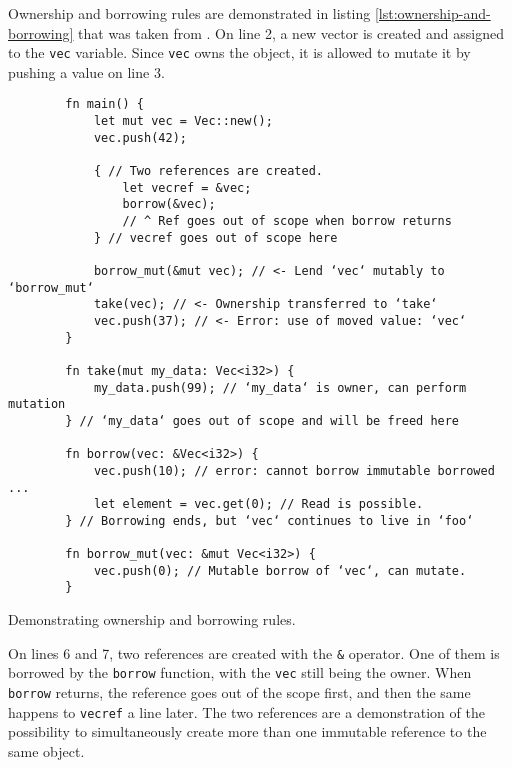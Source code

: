 Ownership and borrowing rules are demonstrated in listing \ref{lst:ownership-and-borrowing} that was taken from \cite{linus-parallelization}. On line 2, a new vector is created and assigned to the \texttt{vec} variable. Since \texttt{vec} owns the object, it is allowed to mutate it by pushing a value on line 3.

\begin{listing}[!htbp]

    \centering
    \begin{verbatim}
        fn main() {
            let mut vec = Vec::new();
            vec.push(42);

            { // Two references are created.
                let vecref = &vec;
                borrow(&vec);
                // ^ Ref goes out of scope when borrow returns
            } // vecref goes out of scope here

            borrow_mut(&mut vec); // <- Lend ‘vec‘ mutably to ‘borrow_mut‘
            take(vec); // <- Ownership transferred to ‘take‘
            vec.push(37); // <- Error: use of moved value: ‘vec‘
        }

        fn take(mut my_data: Vec<i32>) {
            my_data.push(99); // ‘my_data‘ is owner, can perform mutation
        } // ‘my_data‘ goes out of scope and will be freed here

        fn borrow(vec: &Vec<i32>) {
            vec.push(10); // error: cannot borrow immutable borrowed ...
            let element = vec.get(0); // Read is possible.
        } // Borrowing ends, but ‘vec‘ continues to live in ‘foo‘

        fn borrow_mut(vec: &mut Vec<i32>) {
            vec.push(0); // Mutable borrow of ‘vec‘, can mutate.
        }
    \end{verbatim}

    \caption{Demonstrating ownership and borrowing rules.}
    \label{lst:ownership-and-borrowing}
\end{listing}

On lines 6 and 7, two references are created with the \texttt{&} operator. One of them is borrowed by the \texttt{borrow} function, with the \texttt{vec} still being the owner. When \texttt{borrow} returns, the reference goes out of the scope first, and then the same happens to \texttt{vecref} a line later. The two references are a demonstration of the possibility to simultaneously create more than one immutable reference to the same object.


